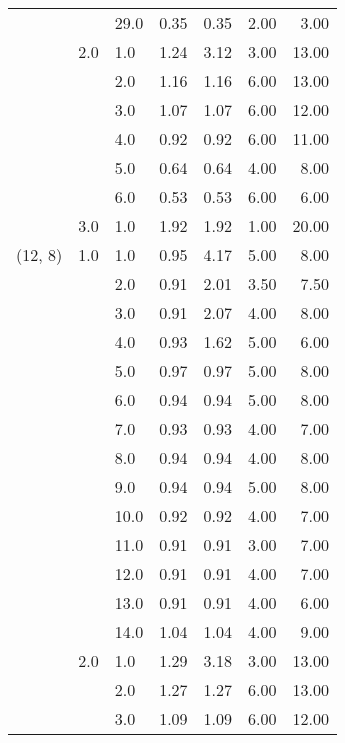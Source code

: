 \begin{tabular}{lllrrrr}
       &     & 29.0 &       0.35 &      0.35 & 2.00 &   3.00 \\
       & 2.0 & 1.0  &       1.24 &      3.12 & 3.00 &  13.00 \\
       &     & 2.0  &       1.16 &      1.16 & 6.00 &  13.00 \\
       &     & 3.0  &       1.07 &      1.07 & 6.00 &  12.00 \\
       &     & 4.0  &       0.92 &      0.92 & 6.00 &  11.00 \\
       &     & 5.0  &       0.64 &      0.64 & 4.00 &   8.00 \\
       &     & 6.0  &       0.53 &      0.53 & 6.00 &   6.00 \\
       & 3.0 & 1.0  &       1.92 &      1.92 & 1.00 &  20.00 \\
(12, 8) & 1.0 & 1.0  &       0.95 &      4.17 & 5.00 &   8.00 \\
       &     & 2.0  &       0.91 &      2.01 & 3.50 &   7.50 \\
       &     & 3.0  &       0.91 &      2.07 & 4.00 &   8.00 \\
       &     & 4.0  &       0.93 &      1.62 & 5.00 &   6.00 \\
       &     & 5.0  &       0.97 &      0.97 & 5.00 &   8.00 \\
       &     & 6.0  &       0.94 &      0.94 & 5.00 &   8.00 \\
       &     & 7.0  &       0.93 &      0.93 & 4.00 &   7.00 \\
       &     & 8.0  &       0.94 &      0.94 & 4.00 &   8.00 \\
       &     & 9.0  &       0.94 &      0.94 & 5.00 &   8.00 \\
       &     & 10.0 &       0.92 &      0.92 & 4.00 &   7.00 \\
       &     & 11.0 &       0.91 &      0.91 & 3.00 &   7.00 \\
       &     & 12.0 &       0.91 &      0.91 & 4.00 &   7.00 \\
       &     & 13.0 &       0.91 &      0.91 & 4.00 &   6.00 \\
       &     & 14.0 &       1.04 &      1.04 & 4.00 &   9.00 \\
       & 2.0 & 1.0  &       1.29 &      3.18 & 3.00 &  13.00 \\
       &     & 2.0  &       1.27 &      1.27 & 6.00 &  13.00 \\
       &     & 3.0  &       1.09 &      1.09 & 6.00 &  12.00 \\

\end{tabular}
